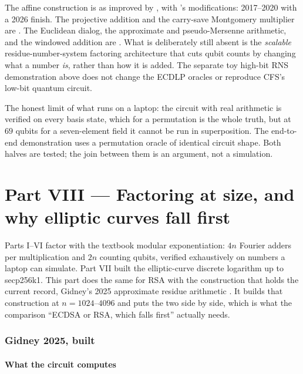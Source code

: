 \documentclass[11pt]{article}
\theoremstyle{plain}
\theoremstyle{remark}
\begin{document}
\begin{keybox}[title={Where this part sits}]
The affine construction is \cite{ec:rnsl17} as improved by \cite{ec:hjnrs20}, with
\cite{ec:kim26}'s modifications: 2017--2020 with a 2026 finish. The projective addition and the
carry-save Montgomery multiplier are \cite{ec:kim26}. The Euclidean dialog, the approximate and
pseudo-Mersenne arithmetic, and the windowed addition are \cite{ec:schrott26}. What is deliberately
still absent is the \emph{scalable} residue-number-system factoring architecture
that cuts qubit counts by changing what a number \emph{is}, rather than how it is
added. The separate toy high-bit RNS demonstration above does not change the
ECDLP oracles or reproduce CFS's low-bit quantum circuit.

The honest limit of what runs on a laptop: the circuit with real arithmetic is verified on every
basis state, which for a permutation is the whole truth, but at $69$ qubits for a
seven-element field it cannot be run in superposition. The end-to-end demonstration uses a
permutation oracle of identical circuit shape. Both halves are tested; the join between them is an
argument, not a simulation.
\end{keybox}

\clearpage
\part*{Part VIII --- Factoring at size, and why elliptic curves fall first}

Parts I--VI factor with the textbook modular exponentiation: $4n$ Fourier adders per
multiplication and $2n$ counting qubits, verified exhaustively on numbers a laptop can simulate.
Part VII built the elliptic-curve discrete logarithm up to secp256k1. This part does the same for
RSA with the construction that holds the current record, Gidney's 2025 approximate residue
arithmetic \cite{ec:gidney25rsa}. It builds that construction at $n=1024$--$4096$ and puts the two
side by side, which is what the comparison ``ECDSA or RSA, which falls first'' actually needs.

\section{Gidney 2025, built}\label{rsa:sec:g25}

\subsection{What the circuit computes}
\end{document}
